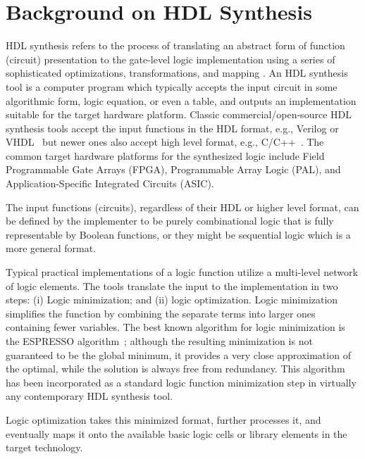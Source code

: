 \section{Background on HDL Synthesis}\label{ssec:synthesis}
HDL synthesis refers to the process of translating an abstract form of  function (circuit) presentation to the gate-level logic implementation using a series of sophisticated optimizations, transformations, and mapping \cite{Techreport:Sentovich1992,Book:DeMicheli1994,Book:Devadas1994,TCAD:Brayton2006}.
An HDL synthesis tool is a computer program which typically accepts the input circuit in some algorithmic form, logic equation, or even a table, and outputs an implementation suitable for the target hardware platform.
Classic commercial/open-source HDL synthesis tools accept the input functions in the HDL format, e.g., Verilog or VHDL~\cite{tool:DesignCompiler,tool:ABC,tool:Encounter,tool:HDLdesigner,tool:PandA,tool:MyHDL} but newer ones also accept high level format, e.g., C/C++~\cite{Gupta2004, tool:Vivado}.
The common target hardware platforms for the synthesized logic include Field Programmable Gate Arrays (FPGA), Programmable Array Logic (PAL), and Application-Specific Integrated Circuits (ASIC).

The input functions (circuits), regardless of their HDL or higher level format, can be defined by the implementer to be purely combinational logic that is fully representable by Boolean functions, or they might be sequential logic which is a more general format.

Typical practical implementations of a logic function utilize a multi-level network of logic elements.
The tools translate the input to the implementation in two steps: (i) Logic minimization; and (ii) logic optimization.
Logic minimization simplifies the function by combining the separate terms into larger ones containing fewer variables.
The best known algorithm for logic minimization is the ESPRESSO algorithm~\cite{book:Brayton1984}; although the resulting minimization is not guaranteed to be the global minimum, it provides a very close approximation of the optimal, while the solution is always free from redundancy.
This algorithm has been incorporated as a standard logic function minimization step in virtually any contemporary HDL synthesis tool.

Logic optimization takes this minimized format, further processes it, and eventually maps it onto the available basic logic cells or library elements in the target technology.

